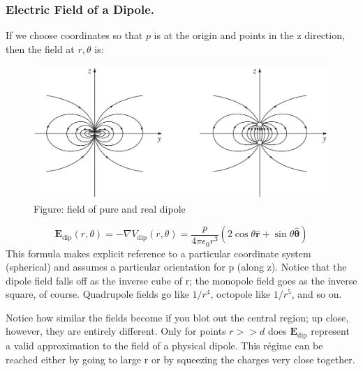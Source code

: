 \documentclass[../../../main.tex]{subfiles}
\begin{document}
\subsubsection*{Electric Field of a Dipole.} If we choose coordinates so that $p$ is at the origin and points in the z direction, then the field at $ r, \theta$ is:
\begin{figure}[h]
    \centering
    \includegraphics[width=\textwidth]{../Rss/Electromagnetism/Potential/MultiPoleField.png}
    \caption*{Figure: field of pure and real dipole}
\end{figure}
\begin{equation*}
    \mathbf{E}_{\text{dip}}(r,\theta)=-\nabla V_{\text{dip}}(r,\theta)=\frac{p}{4\pi \epsilon_0r^3}(2\cos\theta\mathbf{\hat{r}}+\sin\theta\mathbf{\hat{\theta}})
\end{equation*}
This formula makes explicit reference to a particular coordinate system (spherical) and assumes a particular orientation for p (along z). Notice that the dipole field falls off as the inverse cube of r; the monopole field goes as the inverse square, of course. Quadrupole fields go like $1/r^4$, octopole like $1/r^5$, and so on.  

Notice how similar the fields become if you blot out the central region; up close, however, they are entirely different. Only for points $r >> d$ does $\mathbf{E}_{\text{dip}}$ represent a valid approximation to the field of a physical dipole. This régime can be reached either by going to large r or by squeezing the charges very close together.
\end{document}
